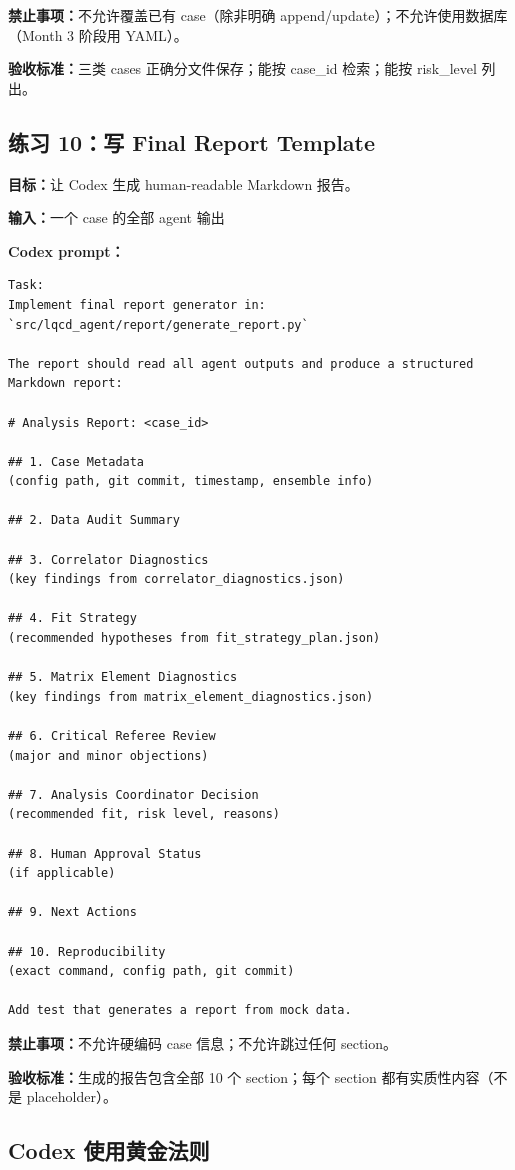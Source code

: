 \documentclass[11pt,a4paper,fontset=fandol]{ctexart}
\begin{document}
\textbf{禁止事项：}不允许覆盖已有 case（除非明确 append/update）；不允许使用数据库（Month 3 阶段用 YAML）。

\textbf{验收标准：}三类 cases 正确分文件保存；能按 case\_id 检索；能按 risk\_level 列出。

\subsection{练习 10：写 Final Report Template}

\textbf{目标：}让 Codex 生成 human-readable Markdown 报告。

\textbf{输入：}一个 case 的全部 agent 输出

\textbf{Codex prompt：}
\begin{lstlisting}
Task:
Implement final report generator in:
`src/lqcd_agent/report/generate_report.py`

The report should read all agent outputs and produce a structured Markdown report:

# Analysis Report: <case_id>

## 1. Case Metadata
(config path, git commit, timestamp, ensemble info)

## 2. Data Audit Summary

## 3. Correlator Diagnostics
(key findings from correlator_diagnostics.json)

## 4. Fit Strategy
(recommended hypotheses from fit_strategy_plan.json)

## 5. Matrix Element Diagnostics
(key findings from matrix_element_diagnostics.json)

## 6. Critical Referee Review
(major and minor objections)

## 7. Analysis Coordinator Decision
(recommended fit, risk level, reasons)

## 8. Human Approval Status
(if applicable)

## 9. Next Actions

## 10. Reproducibility
(exact command, config path, git commit)

Add test that generates a report from mock data.
\end{lstlisting}

\textbf{禁止事项：}不允许硬编码 case 信息；不允许跳过任何 section。

\textbf{验收标准：}生成的报告包含全部 10 个 section；每个 section 都有实质性内容（不是 placeholder）。

\subsection{Codex 使用黄金法则}
\end{document}
